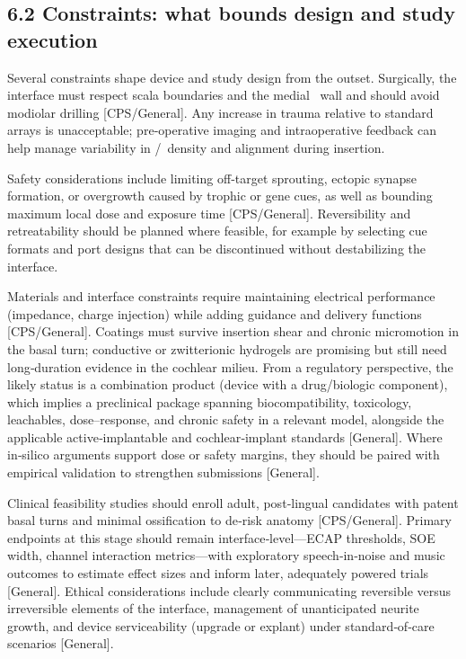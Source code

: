 \subsection*{6.2 Constraints: what bounds design and study execution}

Several constraints shape device and study design from the outset. Surgically, the interface must respect scala boundaries and the medial \ST\ wall and should avoid modiolar drilling [CPS/General]. Any increase in trauma relative to standard arrays is unacceptable; pre‑operative imaging and intraoperative feedback can help manage variability in \OSL/\CPS\ density and alignment during insertion.\cite{Rebscher2008, Sheykholeslami2002}

Safety considerations include limiting off‑target sprouting, ectopic synapse formation, or overgrowth caused by trophic or gene cues, as well as bounding maximum local dose and exposure time [CPS/General]. Reversibility and retreatability should be planned where feasible, for example by selecting cue formats and port designs that can be discontinued without destabilizing the interface.\cite{Kempfle2021, StPeter2022, Scheper2019}

Materials and interface constraints require maintaining electrical performance (impedance, charge injection) while adding guidance and delivery functions [CPS/General]. Coatings must survive insertion shear and chronic micromotion in the basal turn; conductive or zwitterionic hydrogels are promising but still need long‑duration evidence in the cochlear milieu.\cite{Dalrymple2020, Horne2023} From a regulatory perspective, the likely status is a combination product (device with a drug/biologic component), which implies a preclinical package spanning biocompatibility, toxicology, leachables, dose–response, and chronic safety in a relevant model, alongside the applicable active‑implantable and cochlear‑implant standards [General].\cite{ISO14708} Where in‑silico arguments support dose or safety margins, they should be paired with empirical validation to strengthen submissions [General].\cite{USFDA2021InSilico}

Clinical feasibility studies should enroll adult, post‑lingual candidates with patent basal turns and minimal ossification to de‑risk anatomy [CPS/General]. Primary endpoints at this stage should remain interface‑level—ECAP thresholds, SOE width, channel interaction metrics—with exploratory speech‑in‑noise and music outcomes to estimate effect sizes and inform later, adequately powered trials [General].\cite{wilson2008, wilson2014} Ethical considerations include clearly communicating reversible versus irreversible elements of the interface, management of unanticipated neurite growth, and device serviceability (upgrade or explant) under standard‑of‑care scenarios [General].

